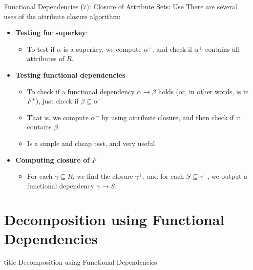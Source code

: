 \documentclass[aspectratio=169, xcolor=dvipsnames]{beamer}
\begin{document}
\begin{frame}{Functional Dependencies (7): Closure of Attribute Sets: Use}
    There are several uses of the attribute closure algorithm:
    \begin{itemize}[<+->]
        \item \textbf{Testing for superkey}:
        \begin{itemize}
            \item[$\triangleright$] To test if $\alpha$ is a superkey, we compute $\alpha^+$, and check if $\alpha^+$ contains all attributes of $R$.
        \end{itemize}
        \item \textbf{Testing functional dependencies}
        \begin{itemize}
            \item[$\triangleright$] To check if a functional dependency $\alpha \rightarrow \beta$ holds (or, in other words, is in $F^+$), just check if $\beta \subseteq \alpha^+$
            \item[$\triangleright$] That is, we compute $\alpha^+$ by using attribute closure, and then check if it contains $\beta$.
            \item[$\triangleright$] Is a simple and cheap test, and very useful
        \end{itemize}
        \item \textbf{Computing closure of $F$}
        \begin{itemize}
            \item[$\triangleright$] For each $\gamma \subseteq R$, we find the closure $\gamma^+$, and for each $S \subseteq \gamma^+$, we output a functional dependency $\gamma \rightarrow S$.
        \end{itemize}
    \end{itemize}
\end{frame}

\section{Decomposition using Functional Dependencies}
\begin{frame}
  \vfill
  \centering
  \begin{beamercolorbox}[sep=8pt,center,shadow=true,rounded=true]{title}
    Decomposition using Functional Dependencies\par%
  \end{beamercolorbox}
  \vfill
\end{frame}
\end{document}
